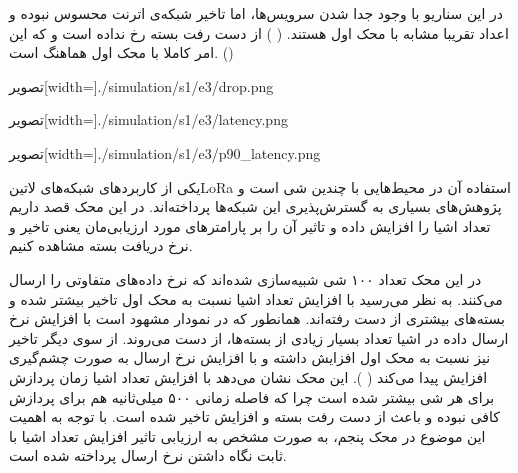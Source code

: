 در این سناریو با وجود جدا شدن سرویس‌ها، اما تاخیر شبکه‌ی اترنت محسوس نبوده و اعداد تقریبا مشابه با محک اول هستند.
( )
از دست رفت بسته رخ نداده است و که این امر کاملا با محک اول هماهنگ است. ()

‌تصویر[width=\textwidth]{./simulation/s1/e3/drop.png}

‌تصویر[width=\textwidth]{./simulation/s1/e3/latency.png}

‌تصویر[width=\textwidth]{./simulation/s1/e3/p90_latency.png}



یکی از کاربردهای شبکه‌های ‌لاتین{LoRa} استفاده آن در محیط‌هایی با چندین شی است و پژوهش‌های بسیاری به گسترش‌پذیری این شبکه‌ها پرداخته‌اند.
در این محک قصد داریم تعداد اشیا را افزایش داده و تاثیر آن را بر پارامترهای مورد ارزیابی‌مان یعنی تاخیر و نرخ دریافت بسته مشاهده کنیم.

در این محک تعداد ۱۰۰ شی شبیه‌سازی شده‌اند که نرخ داده‌های متفاوتی را ارسال می‌کنند. به نظر می‌رسید با افزایش تعداد اشیا نسبت به محک‌ اول تاخیر بیشتر شده و بسته‌های بیشتری
از دست رفته‌اند. همانطور که در نمودار  مشهود است با افزایش نرخ ارسال داده در اشیا
تعداد بسیار زیادی از بسته‌ها، از دست می‌روند.
از سوی دیگر تاخیر نیز نسبت به محک اول افزایش داشته و با افزایش نرخ ارسال به صورت چشم‌گیری افزایش پیدا می‌کند
( ).
این محک نشان می‌دهد با افزایش تعداد اشیا زمان پردازش برای هر شی بیشتر شده است چرا که فاصله زمانی ۵۰۰ میلی‌ثانیه هم برای پردازش کافی نبوده و باعث از دست رفت بسته و
افزایش تاخیر شده است. با توجه به اهمیت این موضوع در محک پنجم، به صورت مشخص به ارزیابی تاثیر افزایش تعداد اشیا با ثابت نگاه داشتن نرخ ارسال پرداخته شده است.

